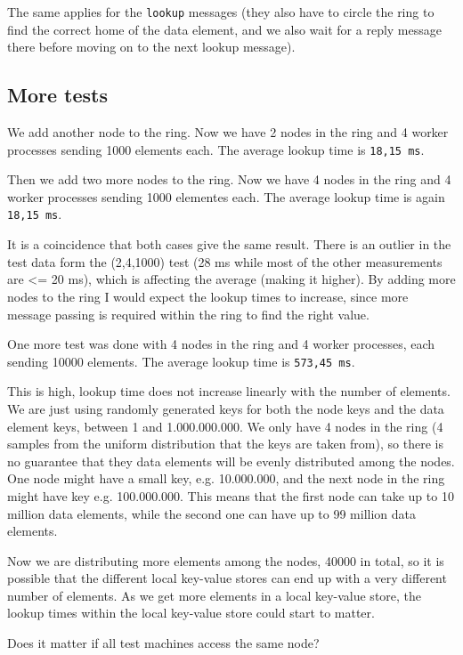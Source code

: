 \documentclass[a4paper, 11pt]{article}
\begin{document}
The same applies for the \texttt{lookup} messages (they also have to circle the ring to find the correct home of the data element, and we also wait for a reply message there before moving on to the next lookup message).

\subsection{More tests}

We add another node to the ring. Now we have 2 nodes in the ring and 4 worker processes sending 1000 elements each. The average lookup time is \texttt{18,15 ms}.

Then we add two more nodes to the ring. Now we have 4 nodes in the ring and 4 worker processes sending 1000 elementes each. The average lookup time is again \texttt{18,15 ms}.

It is a coincidence that both cases give the same result. There is an outlier in the test data form the (2,4,1000) test (28 ms while most of the other measurements are \textless= 20 ms), which is affecting the average (making it higher).
By adding more nodes to the ring I would expect the lookup times to increase, since more message passing is required within the ring to find the right value.

One more test was done with 4 nodes in the ring and 4 worker processes, each sending 10000 elements. The average lookup time is \texttt{573,45 ms}. 

This is high, lookup time does not increase linearly with the number of elements. We are just using randomly generated keys for both the node keys and the data element keys, between 1 and 1.000.000.000. We only have 4 nodes in the ring (4 samples from the uniform distribution that the keys are taken from), so there is no guarantee that they data elements will be evenly distributed among the nodes. One node might have a small key, e.g. 10.000.000, and the next node in the ring might have key e.g. 100.000.000. This means that the first node can take up to 10 million data elements, while the second one can have up to 99 million data elements.

Now we are distributing more elements among the nodes, 40000 in total, so it is possible that the different local key-value stores can end up with a very different number of elements. As we get more elements in a local key-value store, the lookup times within the local key-value store could start to matter.

Does it matter if all test machines access the same node?
\end{document}
